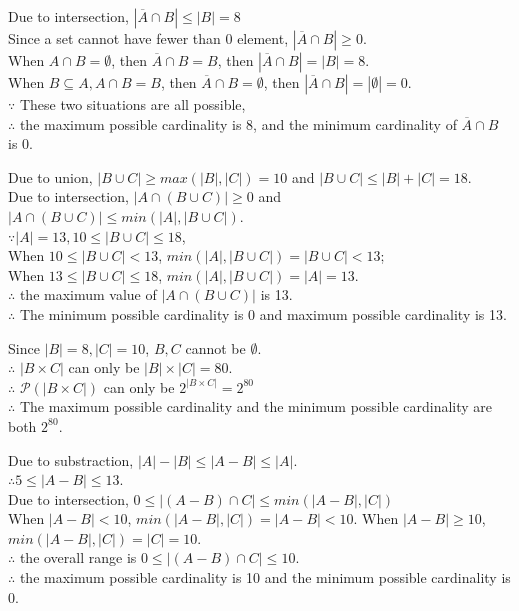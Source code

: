 \documentclass[12pt]{exam}
\begin{document}
\begin{solution}
    \begin{qparts}
        \item 
        Due to intersection, $|\overline{A} \cap B| \leq |B| = 8$\\
        Since a set cannot have fewer than 0 element, $|\overline{A} \cap B| \geq 0$.\\
        When $A \cap B = \emptyset$, then $\overline{A} \cap B = B$, then $|\overline{A} \cap B| = |B| = 8$.\\
        When $B \subseteq A, A \cap B = B$, then $\overline{A} \cap B = \emptyset$, then $|\overline{A} \cap B| = |\emptyset| = 0$.\\
        $\because$ These two situations are all possible, \\
        $\therefore$ the maximum possible cardinality is 8, and the minimum cardinality of $\overline{A} \cap B$ is 0.
        \item 
        Due to union, $|B \cup C| \geq max(|B|,|C|) = 10$ and $|B \cup C| \leq |B| + |C| = 18$.\\
        Due to intersection, $|A \cap (B \cup C)| \geq 0$ and $|A \cap (B \cup C)| \leq min(|A|, |B \cup C|)$.\\
        $\because |A| = 13, 10 \leq |B \cup C| \leq 18$,\\
        When $10 \leq |B \cup C| < 13$, $min(|A|,|B \cup C|) = |B \cup C| < 13$;\\
        When $13 \leq |B \cup C| \leq 18$,  $min(|A|,|B \cup C|) = |A| = 13$.\\
        $\therefore$ the maximum value of $|A \cap (B \cup C)|$ is 13.\\
        $\therefore$ The minimum possible cardinality is 0 and maximum possible cardinality is 13.
        \item 
        Since $|B| = 8, |C| = 10$, $B,C$ cannot be $\emptyset$. \\
        $\therefore$ $|B \times C|$ can only be $|B| \times |C| = 80$. 
        \\$\therefore$ $\mathcal{P}(|B \times C|)$ can only be $2^{|B \times C|} = 2^{80}$
        \\$\therefore$ The maximum possible cardinality and the minimum possible cardinality are both $2^{80}$.
        \item 
        Due to substraction, $|A| - |B| \leq |A- B| \leq |A|$.\\
        $\therefore 5 \leq |A-B| \leq 13$.\\
        Due to intersection, $0 \leq |(A-B) \cap C| \leq min(|A-B|, |C|)$\\
        When $|A - B| <10$, $min(|A-B|, |C|) = |A-B| < 10$. When $|A-B| \geq 10$,  $min(|A-B|, |C|) = |C| = 10$. 
        \\$\therefore $ the overall range is $0 \leq |(A-B) \cap C| \leq 10$.
        \\$\therefore$ the maximum possible cardinality is 10 and the minimum possible cardinality is 0.

    \end{qparts}
\end{solution}
\end{document}
